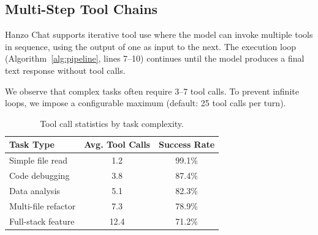 \subsection{Multi-Step Tool Chains}

Hanzo Chat supports iterative tool use where the model can invoke multiple tools in sequence, using the output of one as input to the next. The execution loop (Algorithm~\ref{alg:pipeline}, lines 7--10) continues until the model produces a final text response without tool calls.

We observe that complex tasks often require 3--7 tool calls. To prevent infinite loops, we impose a configurable maximum (default: 25 tool calls per turn).

\begin{table}[H]
\centering
\small
\begin{tabular}{lcc}
\toprule
\textbf{Task Type} & \textbf{Avg. Tool Calls} & \textbf{Success Rate} \\
\midrule
Simple file read & 1.2 & 99.1\% \\
Code debugging & 3.8 & 87.4\% \\
Data analysis & 5.1 & 82.3\% \\
Multi-file refactor & 7.3 & 78.9\% \\
Full-stack feature & 12.4 & 71.2\% \\
\bottomrule
\end{tabular}
\caption{Tool call statistics by task complexity.}
\label{tab:tool_stats}
\end{table}

